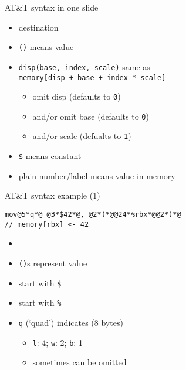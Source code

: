 \begin{frame}{AT\&T syntax in one slide}
    \begin{itemize}
    \item destination 
    \item {\tt ()} means value 
    \item {\tt disp(base, index, scale)} same as \\ {\tt memory[disp + base + index * scale]}
        \begin{itemize}
        \item omit disp (defaults to {\tt 0})
        \item and/or omit base (defaults to {\tt 0})
        \item and/or scale (defualts to {\tt 1})
        \end{itemize}
    \item {\tt \$} means constant
    \item plain number/label means value in memory
    \end{itemize}
\end{frame}

\begin{frame}[fragile,label=att2e1]{AT\&T syntax example (1)}
\begin{lstlisting}
mov@5*q*@ @3*$42*@, @2*(*@@24*%rbx*@@2*)*@
// memory[rbx] <- 42
\end{lstlisting}
    \begin{itemize}
    \item {}
    \item {\tt ()}s represent value \myemph<2>{in memory}
    \item {} start with {\tt \$}
    \item {} start with {\tt \%}
    \item {\tt q} (`quad') indicates  (8 bytes)
    \begin{itemize}\item {\tt l}: 4; {\tt w}: 2; {\tt b}: 1
                   \item sometimes can be omitted\end{itemize}
    \end{itemize}
\end{frame}

